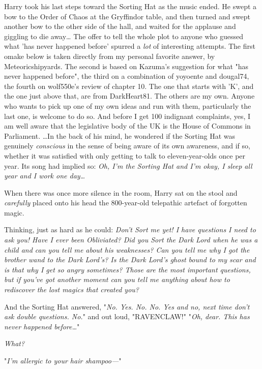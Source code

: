 Harry took his last steps toward the Sorting Hat as the music ended. He swept a 
bow to the Order of Chaos at the Gryffindor table, and then turned and swept 
another bow to the other side of the hall, and waited for the applause and 
giggling to die away{\ldots}
\sbreak
The offer to tell the whole plot to anyone who guessed what 'has never happened 
before' spurred a \emph{lot} of interesting attempts. The first omake below is 
taken directly from my personal favorite answer, by Meteoricshipyards. The 
second is based on Kazuma's suggestion for what "has never happened before", 
the third on a combination of yoyoente and dougal74, the fourth on wolf550e's 
review of chapter 10. The one that starts with 'K', and the one just above 
that, are from DarkHeart81. The others are my own. Anyone who wants to pick up 
one of my own ideas and run with them, particularly the last one, is welcome to 
do so. And before I get 100 indignant complaints, yes, I am well aware that the 
legislative body of the UK is the House of Commons in Parliament.
\sbreak
{\ldots}In the back of his mind, he wondered if the Sorting Hat was genuinely 
\emph{conscious} in the sense of being aware of its own awareness, and if so, 
whether it was satisfied with only getting to talk to eleven-year-olds once per 
year. Its song had implied so: \emph{Oh, I'm the Sorting Hat and I'm okay, I 
sleep all year and I work one day{\ldots}}

When there was once more silence in the room, Harry sat on the stool and 
\emph{carefully} placed onto his head the 800-year-old telepathic artefact of 
forgotten magic.

Thinking, just as hard as he could: \emph{Don't Sort me yet! I have questions I 
need to ask you! Have I ever been Obliviated? Did you Sort the Dark Lord when 
he was a child and can you tell me about his weaknesses? Can you tell me why I 
got the brother wand to the Dark Lord's? Is the Dark Lord's ghost bound to my 
scar and is that why I get so angry sometimes? Those are the most important 
questions, but if you've got another moment can you tell me anything about how 
to rediscover the lost magics that created you?}

And the Sorting Hat answered, "\emph{No. Yes. No. No. Yes and no, next time 
don't ask double questions. No.}" and out loud, "RAVENCLAW!"
\sbreak
"\emph{Oh, dear. This has never happened before{\ldots}}"

\emph{What?}

"\emph{I'm allergic to your hair shampoo---}"

